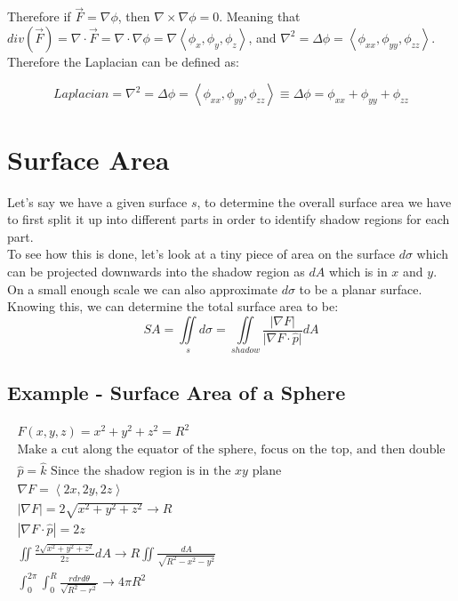 \documentclass{article}
\newcommand{\nvec}[1]{\left\langle #1 \right\rangle}
\newcommand{\abs}[1]{\left\lvert #1 \right\rvert}
\begin{document}
Therefore if $\vec{F}=\nabla\phi$, then $\nabla \times \nabla\phi = 0$. Meaning that $div(\vec{F}) = \nabla \cdot \vec{F} = \nabla \cdot \nabla\phi = \nabla \nvec{\phi_x, \phi_y, \phi_z}$, and $\nabla^2 = \Delta\phi = \nvec{\phi_{xx}, \phi_{yy}, \phi_{zz}}$. Therefore the Laplacian can be defined as:

\begin{equation}
Laplacian=\nabla^2 = \Delta\phi = \nvec{\phi_{xx}, \phi_{yy}, \phi_{zz}} \equiv \Delta \phi = \phi_{xx} + \phi_{yy} + \phi_{zz}
\end{equation}

\section{Surface Area}
Let's say we have a given surface $s$, to determine the overall surface area we have to first split it up into different parts in order to identify shadow regions for each part.\\

To see how this is done, let's look at a tiny piece of area on the surface $d \sigma$ which can be projected downwards into the shadow region as $dA$ which is in $x$ and $y$. On a small enough scale we can also approximate $d \sigma$ to be a planar surface.\\

Knowing this, we can determine the total surface area to be:
\[
SA = \iint\limits_s d \sigma = \iint\limits_{shadow} \frac{\lvert \nabla F \rvert}{\lvert \nabla F \cdot \hat{p} \rvert} dA
\]

    \subsection{Example - Surface Area of a Sphere}

    \[
    \begin{aligned}
    F(x,y,z) = x^2 + y^2 + z^2 = R^2\\
    \text{Make a cut along the equator of the sphere, focus on the top, and then double}\\
    \hat{p} = \hat{k} \text{ Since the shadow region is in the $xy$ plane}\\
    \nabla F = \nvec{2x, 2y, 2z}\\
    \abs{\nabla F} = 2 \sqrt{x^2 + y^2 + z^2} \to R\\
    \abs{\nabla F \cdot \hat{p}} = 2z\\
    \iint \frac{2 \sqrt{x^2 + y^2 + z^2}}{2z} dA \to R \iint \frac{dA}{\sqrt{R^2 - x^2 - y^2}}\\
    \int_0^{2\pi} \int_0^R \frac{rdrd\theta}{\sqrt{R^2 - r^2}} \to 4\pi R^2
    \end{aligned}
    \]
\end{document}
